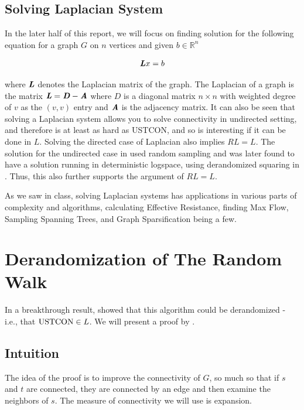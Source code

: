 \documentclass{article}
\begin{document}
\subsection{Solving Laplacian System}

In the later half of this report, we will focus on finding solution for the following equation for a graph $G$ on $n$ vertices and given $b\in \mathbb{R}^n$

$$\LL x=b$$

where $\LL$ denotes the Laplacian matrix of the graph. The Laplacian of a graph is the matrix $\LL=\boldsymbol{\mathit{D}}-\AA$ where $\boldsymbol{\mathit{D}}$ is a diagonal matrix $n\times n$ with weighted degree of $v$ as the $(v,v)$ entry and $\AA$ is the adjacency matrix. It can also be seen that solving a Laplacian system allows you to solve connectivity in undirected setting, and therefore is at least as hard as USTCON, and so is interesting if it can be done in $L$. Solving the directed case of Laplacian also implies $RL=L$. The solution for the undirected case in \cite{peng2014efficient} used random sampling and was later found to have a solution running in deterministic logspace, using derandomized squaring in \cite{murtaghDerandomizationConnectivityUndirected2017}. Thus, this also further supports the argument of $RL=L$.

As we saw in class, solving Laplacian systems has applications in various parts of complexity and algorithms, calculating Effective Resistance, finding Max Flow, Sampling Spanning Trees, and Graph Sparsification being a few.



\section{Derandomization of The Random Walk}
In a breakthrough result, \cite{reingoldUndirectedConnectivityLogspace2005} showed that this algorithm could be derandomized - i.e., that $\USTCON \in L$. We will present a proof by \cite{rozenmanDerandomizedSquaringGraphs2005}. 


\subsection{Intuition}
The idea of the proof is to improve the connectivity of $G$, so much so that if $s$ and $t$ are connected, they are connected by an edge and then examine the neighbors of $s$. The measure of connectivity we will use is expansion.
\end{document}
